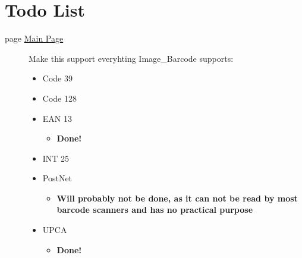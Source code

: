 \hypertarget{todo}{}\section{Todo List}\label{todo}
\label{todo__todo000001}
\hypertarget{todo__todo000001}{}
 \begin{description}
\item[page \hyperlink{index}{Main Page} ]Make this support everyhting Image\_\-Barcode supports:\begin{itemize}
\item Code 39\item Code 128\item EAN 13\begin{itemize}
\item {\bf Done!} \end{itemize}
\item INT 25\item PostNet\begin{itemize}
\item {\bf Will probably not be done, as it can not be read by most barcode scanners and has no practical purpose}\end{itemize}
\item UPCA\begin{itemize}
\item {\bf Done!} \end{itemize}
\end{itemize}


\end{description}
